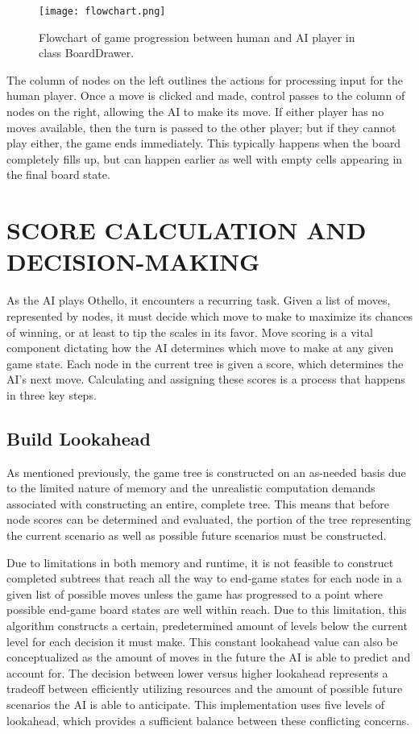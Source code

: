 \documentclass[conference]{IEEEtran}
\begin{document}
\begin{figure}[htbp]
\centerline{\texttt{[image: flowchart.png]}}
\caption{Flowchart of game progression between human and AI player in class BoardDrawer.}
\label{fig}
\end{figure}

The column of nodes on the left outlines the actions for processing input for the human player. Once a move is clicked and made, control passes to the column of nodes on the right, allowing the AI to make its move. If either player has no moves available, then the turn is passed to the other player; but if they cannot play either, the game ends immediately. This typically happens when the board completely fills up, but can happen earlier as well with empty cells appearing in the final board state.

\section{SCORE CALCULATION AND DECISION-MAKING}
As the AI plays Othello, it encounters a recurring task. Given a list of moves, represented by nodes, it must decide which move to make to maximize its chances of winning, or at least to tip the scales in its favor. Move scoring is a vital component dictating how the AI determines which move to make at any given game state. Each node in the current tree is given a score, which determines the AI’s next move. Calculating and assigning these scores is a process that happens in three key steps.

\subsection{Build Lookahead}
As mentioned previously, the game tree is constructed on an as-needed basis due to the limited nature of memory and the unrealistic computation demands associated with constructing an entire, complete tree. This means that before node scores can be determined and evaluated, the portion of the tree representing the current scenario as well as possible future scenarios must be constructed.

Due to limitations in both memory and runtime, it is not feasible to construct completed subtrees that reach all the way to end-game states for each node in a given list of possible moves unless the game has progressed to a point where possible end-game board states are well within reach. Due to this limitation, this algorithm constructs a certain, predetermined amount of levels below the current level for each decision it must make. This constant lookahead value can also be conceptualized as the amount of moves in the future the AI is able to predict and account for. The decision between lower versus higher lookahead represents a tradeoff between efficiently utilizing resources and the amount of possible future scenarios the AI is able to anticipate. This implementation uses five levels of lookahead, which provides a sufficient balance between these conflicting concerns.
\end{document}
